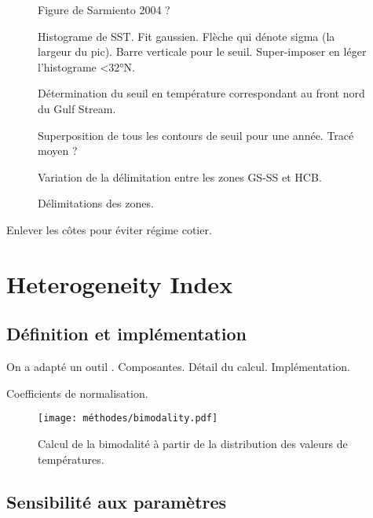 \documentclass[index]{subfiles}
\begin{document}
\begin{figure}
  \caption{Figure de Sarmiento 2004 ?}
  \label{fig:sarmiento}
\end{figure}

\begin{figure}
  Histograme de SST. Fit gaussien. Flèche qui dénote sigma (la largeur du pic).
  Barre verticale pour le seuil.
  Super-imposer en léger l'histograme <32°N.
  \caption{Détermination du seuil en température correspondant au front nord du Gulf Stream.}
  \label{fig:seuil-temp}
\end{figure}


\begin{figure}
  Superposition de tous les contours de seuil pour une année.
  Tracé moyen ?
  \caption{Variation de la délimitation entre les zones GS-SS et HCB.}
  \label{fig:var-delim}
\end{figure}


\begin{figure}
  \caption{Délimitations des zones.}
  \label{fig:zone-delimitation}
\end{figure}

Enlever les côtes pour éviter régime cotier.

\section{Heterogeneity Index}
\label{sec:HI}

\subsection{Définition et implémentation}
\label{sec:HI-definition}

On a adapté un outil \parencite{liu_2016}.
Composantes.
Détail du calcul.
Implémentation.

Coefficients de normalisation.

\begin{figure}
  \centering
  \texttt{[image: méthodes/bimodality.pdf]}
  \caption[Calcul de la bimodalité]{Calcul de la bimodalité à partir de la distribution des valeurs de températures.}
  \label{fig:bimodality}
\end{figure}

\subsection{Sensibilité aux paramètres}
\label{sec:HI-sensibilite}
\end{document}
